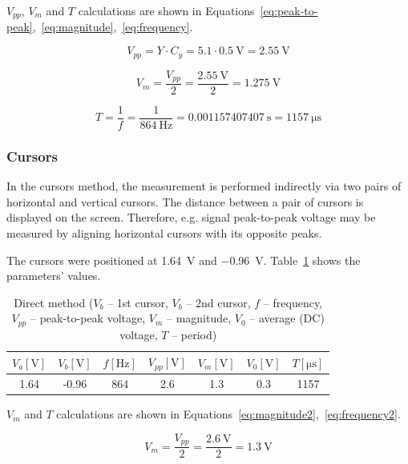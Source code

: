 $V_{pp}$, $V_{m}$ and $T$ calculations are shown in Equations~\ref{eq:peak-to-peak},~\ref{eq:magnitude},~\ref{eq:frequency}.


\begin{equation}
	V_{pp} = Y\cdot C_{y} = 5.1\cdot \SI{0.5}{\volt} = \SI{2.55}{\volt}
	\label{eq:peak-to-peak}
\end{equation}

\begin{equation}
	V_{m} = \frac{V_{pp}}{2} = \frac{\SI{2.55}{\volt}}{2} = \SI{1.275}{\volt}
	\label{eq:magnitude}
\end{equation}

\begin{equation}
	T = \frac{1}{f} = \frac{1}{\SI{864}{\hertz}} = \SI{0.001157407407}{\second} = \SI{1157}{\micro\second}
	\label{eq:frequency}
\end{equation}

\subsubsection*{Cursors}

In the cursors method, the measurement is performed indirectly via two pairs of horizontal and vertical cursors. The distance between a pair of cursors is displayed on the screen. Therefore, e.g. signal peak-to-peak voltage may be measured by aligning horizontal cursors with its opposite peaks.

The cursors were positioned at \SI{1.64}{\volt} and \SI{-0.96}{\volt}. Table~\ref{tab:cursors-method} shows the parameters' values.

\begin{table}[H]
	\centering
	\begin{tabular}{c|c|c|c|c|c|c}
		$V_{a} [\unit\volt]$ & $V_{b} [\unit\volt]$ & $f [\unit{\hertz}]$ & $V_{pp} [\unit{\volt}]$ & $V_{m} [\unit{\volt}]$ & $V_{0} [\unit{\volt}]$ & $T [\unit{\micro\second}]$\\
		\hline
		1.64 & -0.96 & 864 & 2.6 & 1.3 & 0.3 & 1157
	\end{tabular}
	\caption{Direct method ($V_{b}$ -- 1st cursor, $V_{b}$ -- 2nd cursor, $f$ -- frequency, $V_{pp}$ -- peak-to-peak voltage, $V_{m}$ -- magnitude, $V_{0}$ -- average (DC) voltage, $T$ -- period)}
	\label{tab:cursors-method}
\end{table}

$V_{m}$ and $T$ calculations are shown in Equations~\ref{eq:magnitude2},~\ref{eq:frequency2}.

\begin{equation}
	V_{m} = \frac{V_{pp}}{2} = \frac{\SI{2.6}{\volt}}{2} = \SI{1.3}{\volt}
	\label{eq:magnitude2}
\end{equation}

